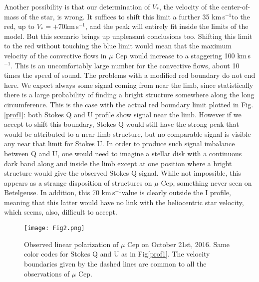 \documentclass{/Users/art2/TeX/aanda/aa}
\def\kms {km\,s$^{-1}$}
\begin{document}
Another possibility is that our determination of $V_*$, the velocity of the center-of-mass of the star, is wrong. It suffices to shift this limit a further 35 \kms to the red, up to $V_*=+70$\kms, and the peak will entirely fit inside the limits of the model. But this scenario  brings up unpleasant conclusions too. Shifting this limit to the red  without touching the blue limit would mean that the maximum velocity of the convective flows in $\mu$ Cep would increase to a staggering 100 \kms. This is an uncomfortably large number for the convective flows, about 10 times the speed of sound. The problems with a modified red boundary do not end here. We expect always some signal coming from near the limb, since statistically there is a large probability of finding a bright structure somewhere along the long circumference. This is the case with the actual red boundary limit plotted in Fig.\ref{prof1}: both Stokes Q and U profile show signal near the limb. However if we accept to shift this boundary, Stokes Q would still have the strong peak that would be attributed to a near-limb structure, but no comparable signal is visible any near that limit for Stokes U. In order to produce such signal imbalance between Q and U, one would need to imagine a stellar disk with a continuous dark band along and inside the limb except at one position where a bright structure would give the observed Stokes Q signal. While not impossible, this appears as a strange disposition of structures on $\mu$ Cep, something never seen on Betelgeuse. In addition, this 70 \kms value is clearly outside the I profile, meaning that this latter would have no link with the heliocentric star velocity, which seems, also, difficult to accept.


\begin{figure*}
\texttt{[image: Fig2.png]}
\caption{Observed linear polarization of $\mu$ Cep on October 21st, 2016. Same color codes for Stokes Q and U as in Fig\ref{prof1}. The velocity boundaries given by the dashed lines are common to all the observations of $\mu$ Cep.}
\label{prof2}
\end{figure*}
\end{document}
